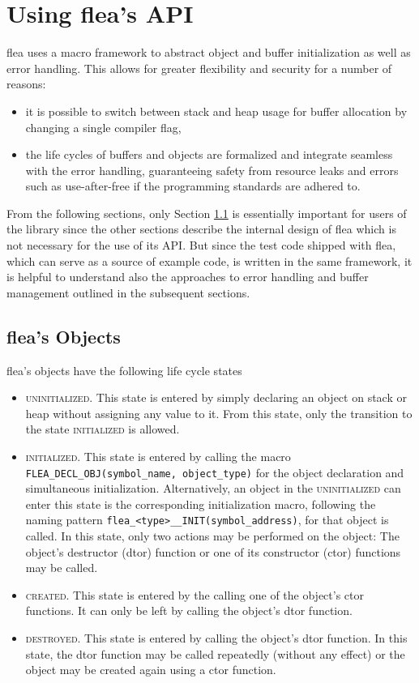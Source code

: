 \documentclass[a4paper,11pt]{scrartcl}
\newcommand{\stateUninit}{\textsc{uninitialized}\xspace}
\newcommand{\stateInit}{\textsc{initialized}\xspace}
\newcommand{\stateCreated}{\textsc{created}\xspace}
\newcommand{\stateDestroyed}{\textsc{destroyed}\xspace}
\begin{document}
\section{Using flea's API}

flea uses a macro framework to abstract object and buffer initialization as well
as error handling. This allows for greater flexibility and security for a number of reasons:
\begin{itemize}
  \item it is possible to switch between stack and heap usage for buffer allocation
  by changing a single compiler flag,
  \item the life cycles of buffers and objects are formalized and integrate
    seamless with the error handling, guaranteeing safety from resource leaks
    and errors such as use-after-free if the programming standards are adhered
    to.
\end{itemize}

From the following sections, only Section \ref{secFleaObj} is essentially
important for users of the library since the other sections describe the
internal design of flea which is not necessary for the use of its API. But since
the test code shipped with flea, which can serve as a source of example code, is
written in the same framework, it is helpful to understand also the approaches
to error handling and buffer management outlined in the subsequent sections.
\subsection{flea's Objects}
\label{secFleaObj}
flea's objects have the following life cycle states 
\begin{itemize}
  \item \stateUninit. This state is entered by simply declaring an object on
    stack or heap without assigning any value to it. From this state, only the
    transition to the state \stateInit is allowed.
  \item \stateInit. This state is entered by calling the macro
    \verb#FLEA_DECL_OBJ(symbol_name, object_type)# for the object declaration
    and simultaneous initialization. Alternatively, an object in the
    \stateUninit can enter this state is the corresponding initialization macro,
    following the naming pattern \verb#flea_<type>__INIT(symbol_address)#,
    for that object is called.
    In this state, only two
    actions may be performed on the object: The object's destructor (dtor)
    function or one of its constructor (ctor) functions may be called.
  \item \stateCreated. This state is entered by the calling one of the object's
    ctor functions. It can only be left by calling the object's dtor function.
  \item \stateDestroyed. This state is entered by calling the object's dtor
    function. In this state, the dtor function may be called repeatedly (without
    any effect) or the object may be created again using a ctor function.
\end{itemize}
\end{document}
